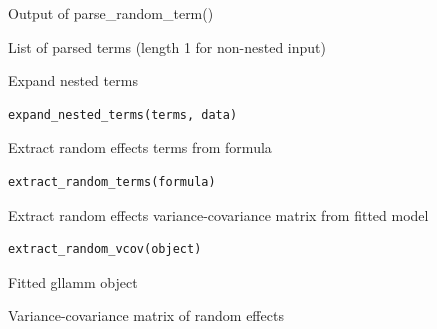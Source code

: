 \documentclass[a4paper]{book}
\begin{document}
%
\begin{Arguments}
\begin{ldescription}
\item[\code{parsed\_term}] Output of parse\_random\_term()
\end{ldescription}
\end{Arguments}
%
\begin{Value}
List of parsed terms (length 1 for non-nested input)
\end{Value}
%
\begin{Description}
Expand nested terms
\end{Description}
%
\begin{Usage}
\begin{verbatim}
expand_nested_terms(terms, data)
\end{verbatim}
\end{Usage}
%
\begin{Description}
Extract random effects terms from formula
\end{Description}
%
\begin{Usage}
\begin{verbatim}
extract_random_terms(formula)
\end{verbatim}
\end{Usage}
%
\begin{Description}
Extract random effects variance-covariance matrix from fitted model
\end{Description}
%
\begin{Usage}
\begin{verbatim}
extract_random_vcov(object)
\end{verbatim}
\end{Usage}
%
\begin{Arguments}
\begin{ldescription}
\item[\code{object}] Fitted gllamm object
\end{ldescription}
\end{Arguments}
%
\begin{Value}
Variance-covariance matrix of random effects
\end{Value}
\end{document}
